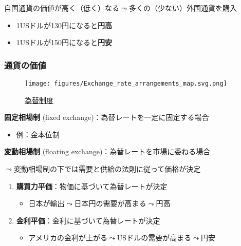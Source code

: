 \documentclass[
  xelatex,
  ja=standard]{bxjsarticle}
\providecommand{\tightlist}{%
  \setlength{\itemsep}{0pt}\setlength{\parskip}{0pt}}\usepackage{longtable,booktabs,array}
\begin{document}
自国通貨の価値が高く（低く）なる\(\leadsto\)多くの（少ない）外国通貨を購入

\begin{itemize}
\tightlist
\item
  1USドルが130円になると\textbf{円高}
\item
  1USドルが150円になると\textbf{円安}
\end{itemize}

\hypertarget{ux901aux8ca8ux306eux4fa1ux5024}{%
\subsubsection{通貨の価値}\label{ux901aux8ca8ux306eux4fa1ux5024}}

\begin{figure}[htpb]

{\centering \texttt{[image: figures/Exchange\_rate\_arrangements\_map.svg.png]}

}

\caption{\href{https://commons.wikimedia.org/wiki/File:Exchange_rate_arrangements_map.svg}{為替制度}}

\end{figure}

\textbf{固定相場制} (fixed exchange)：為替レートを一定に固定する場合

\begin{itemize}
\tightlist
\item
  例：金本位制
\end{itemize}

\textbf{変動相場制} (floating exchange)：為替レートを市場に委ねる場合

\(\leadsto\)変動相場制の下では需要と供給の法則に従って価格が決定

\begin{enumerate}
\def\labelenumi{\arabic{enumi}.}
\tightlist
\item
  \textbf{購買力平価}：物価に基づいて為替レートが決定

  \begin{itemize}
  \tightlist
  \item
    日本が輸出\(\leadsto\)日本円の需要が高まる\(\leadsto\)円高
  \end{itemize}
\item
  \textbf{金利平価}：金利に基づいて為替レートが決定

  \begin{itemize}
  \tightlist
  \item
    アメリカの金利が上がる\(\leadsto\)USドルの需要が高まる\(\leadsto\)円安
  \end{itemize}
\end{enumerate}
\end{document}
